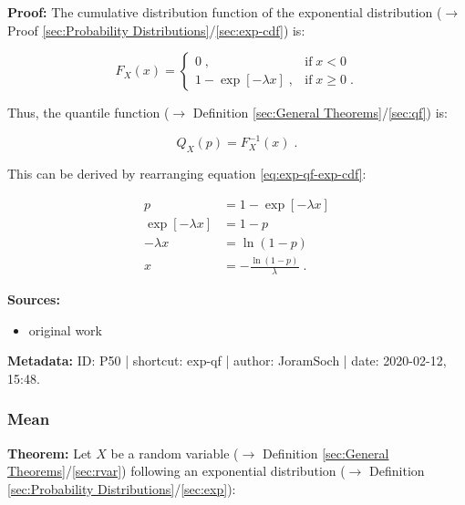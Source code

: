 \documentclass[a4paper,12pt,twoside]{book}
\begin{document}
\vspace{1em}
\textbf{Proof:} The cumulative distribution function of the exponential distribution ($\rightarrow$ Proof \ref{sec:Probability Distributions}/\ref{sec:exp-cdf}) is:

\begin{equation} \label{eq:exp-qf-exp-cdf}
F_X(x) = \left\{
\begin{array}{rl}
0 \; , & \text{if} \; x < 0 \\
1 - \exp[-\lambda x] \; , & \text{if} \; x \geq 0 \; .
\end{array}
\right.
\end{equation}

Thus, the quantile function ($\rightarrow$ Definition \ref{sec:General Theorems}/\ref{sec:qf}) is:

\begin{equation} \label{eq:exp-qf-exp-qf-s1}
Q_X(p) = F_X^{-1}(x) \; .
\end{equation}

This can be derived by rearranging equation \eqref{eq:exp-qf-exp-cdf}:

\begin{equation} \label{eq:exp-qf-exp-qf-s2}
\begin{split}
p &= 1 - \exp[-\lambda x] \\
\exp[-\lambda x] &= 1-p \\
-\lambda x &= \ln(1-p) \\
x &= -\frac{\ln(1-p)}{\lambda} \; .
\end{split}
\end{equation}


\vspace{1em}
\textbf{Sources:}
\begin{itemize}
\item original work\end{itemize}


\vspace{1em}
\textbf{Metadata:} ID: P50 | shortcut: exp-qf | author: JoramSoch | date: 2020-02-12, 15:48.
\vspace{1em}



\subsubsection[\textbf{Mean}]{Mean} \label{sec:exp-mean}
\setcounter{equation}{0}

\textbf{Theorem:} Let $X$ be a random variable ($\rightarrow$ Definition \ref{sec:General Theorems}/\ref{sec:rvar}) following an exponential distribution ($\rightarrow$ Definition \ref{sec:Probability Distributions}/\ref{sec:exp}):
\end{document}
